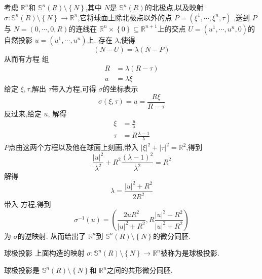\documentclass[../../几何与拓扑.tex]{subfiles}
\begin{document}
考虑 \(  \mathbb{R} ^{n}  \)和 \(  \mathbb{S}^{n}\left( R \right) \setminus \left\{ N \right\}  \),其中 \(  N  \)是    \(  \mathbb{S}^{n} \left( R \right)  \)的北极点,以及映射 \(   \sigma : \mathbb{S}^{n}\left( R \right)\setminus \left\{ N \right\}\to\mathbb{R} ^{n}   \),它将球面上除北极点以外的点 \(  P =   \left(  \xi^1,\cdots,\xi^n ,\tau  \right)  \) ,送到  \(  P  \)与 \(  N = \left( 0,\cdots ,0,R \right)  \)的连线在 \(  \mathbb{R} ^{n}\times \left\{ 0  \right\} \subseteq \mathbb{R} ^{n+ 1}  \)上的交点 \(  U= \left(  u^1,\cdots,u^n ,0 \right)   \)的自然投影 \(  u= \left(  u^1,\cdots,u^n  \right)   \)上.  存在 \(   \lambda   \),使得 \[
\left( N-U\right)=  \lambda \left( N-P \right)  
\]     从而有方程 组\[
\begin{aligned}
    R& =  \lambda \left( R-\tau  \right) \\ 
   u & = \lambda  \xi   
\end{aligned}
\]给定 \(   \xi   ,\tau \),解出 \(  \tau   \)带入方程,可得 \(   \sigma   \)的坐标表示 \[
 \sigma \left(  \xi ,\tau  \right)= u =   \frac{R \xi  }{R-\tau  }  
\] 反过来,给定 \(  u  \),   解得 \[
\begin{aligned}
 \xi &=  \frac{u }{ \lambda  } \\ 
  \tau  & =  R \frac{ \lambda -1 }{ \lambda  } 
\end{aligned}
\] \(  P  \)点由这两个方程以及他在球面上刻画,带入 \(  \left|  \xi  \right|^{2}+ \left| \tau  \right|^{2}= \mathbb{R} ^{2}    \),得到 \[
\frac{\left| u \right|^{2}  }{  \lambda ^{2}}+  R^{2}\frac{\left(  \lambda -1 \right)^{2}  }{ \lambda ^{2} }= R^{2}  
\]  解得  \[
 \lambda  =  \frac{\left| u \right|^{2}+ R^{2}  }{ 2R^{2}} 
\]带入 方程,得到 \[
  \sigma ^{-1} \left( u \right)= \left(  \frac{2uR^{2} }{\left| u \right|^{2}+ R^{2}  },  R \frac{\left| u \right|^{2}-R^{2}  }{\left| u \right|^{2}+ R^{2}  }   \right) 
\]为 \(   \sigma   \)的逆映射. 从而给出了 \(  \mathbb{R} ^{n}  \)到 \(  \mathbb{S}^{n}\left( R \right)\setminus \left\{ N \right\}   \)的微分同胚.

\begin{definition}{球极投影}
    上面构造的映射 \(   \sigma : \mathbb{S}^{n}\left( R \right)\setminus \left\{ N \right\}\to \mathbb{R} ^{n}   \)被称为是球极投影. 
\end{definition}

\begin{proposition}
    球极投影是 \(  \mathbb{S}^{n}\left( R \right)\setminus \left\{ N \right\}   \)和 \(  \mathbb{R} ^{n}  \)之间的共形微分同胚.  
\end{proposition}
\end{document}

